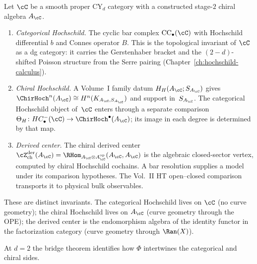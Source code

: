 \begin{definition}
\label{def:three-hochschild}
Let $\cC$ be a smooth proper CY$_d$ category with a constructed
stage-$2$ chiral algebra $A_\cC$.
\begin{enumerate}[label=(\roman*)]
 \item \emph{Categorical Hochschild.} The cyclic bar complex $\mathrm{CC}_\bullet(\cC)$ with Hochschild differential $b$ and Connes operator $B$. This is the topological invariant of $\cC$ as a dg category: it carries the Gerstenhaber bracket and the $(2-d)$-shifted Poisson structure from the Serre pairing (Chapter~\ref{ch:hochschild-calculus}).
 \item \emph{Chiral Hochschild.} A Volume~I family datum
 $H_H(A_\cC;S_{A_\cC})$ gives
 $\ChirHoch^n(A_\cC)\cong H^n(K_{A_\cC,S_{A_\cC}})$ and support
 in~$S_{A_\cC}$.  The categorical Hochschild object of~$\cC$
 enters through a separate comparison
 $\Theta_H\colon HC^-_\bullet(\cC)\to\ChirHoch^\bullet(A_\cC)$;
 its image in each degree is determined by that map.
 \item \emph{Derived center.} The chiral derived center
 $\cZ^{\mathrm{der}}_{\mathrm{ch}}(A_\cC)
 =\RHom_{A_\cC\otimes A_\cC^{\mathrm{op}}}(A_\cC,A_\cC)$ is the
 algebraic closed-sector vertex, computed by chiral Hochschild
 cochains.  A bar resolution supplies a model under its comparison
 hypotheses.  The Vol.~II HT open--closed comparison transports it
 to physical bulk observables.
\end{enumerate}
These are distinct invariants. The categorical Hochschild lives on $\cC$ (no curve geometry); the chiral Hochschild lives on $A_\cC$ (curve geometry through the OPE); the derived center is the endomorphism algebra of the identity functor in the factorization category (curve geometry through $\Ran(X)$).
\end{definition}

At $d=2$ the bridge theorem identifies how $\Phi$ intertwines the
categorical and chiral sides.

